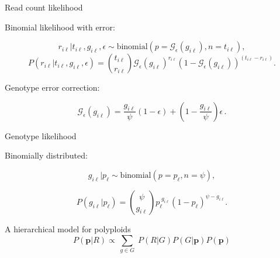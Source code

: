 \documentclass[presentation,serif]{beamer}
\begin{document}
\begin{frame}[c]{Read count likelihood}

	Binomial likelihood with error:

	\begin{equation*}
		r_{i\ell}|t_{i\ell},g_{i\ell},\epsilon \sim \text{binomial}(p = \mathcal{G}_\epsilon(g_{i\ell}), n = t_{i\ell}),
	\end{equation*}
	\pause
	\begin{equation}
		P(r_{i\ell}|t_{i\ell},g_{i\ell},\epsilon) = \binom{t_{i\ell}}{r_{i\ell}} \mathcal{G}_\epsilon(g_{i\ell})^{r_{i\ell}}(1 - \mathcal{G}_\epsilon(g_{i\ell}))^{(t_{i\ell}-r_{i\ell})}.
	\end{equation}
	\pause

	\vspace{0.25in}

	Genotype error correction:

	\begin{equation}
		\mathcal{G}_\epsilon(g_{i\ell}) = \frac{g_{i\ell}}{\psi}(1 - \epsilon) + \left(1 - \frac{g_{i\ell}}{\psi}\right)\epsilon\,.
	\end{equation}

\end{frame}

\begin{frame}[c]{Genotype likelihood}

	Binomially distributed:

	\begin{equation*}
		g_{i\ell}|p_\ell \sim \text{binomial}(p = p_\ell, n = \psi),
	\end{equation*}
	\pause

	\begin{equation}
		P(g_{i\ell}|p_\ell) = \binom{\psi}{g_{i\ell}} p_\ell ^ {\;g_{i\ell}} (1 - p_\ell)^{\psi - g_{i\ell}}.
	\end{equation}



\end{frame}

\begin{frame}[c]{A hierarchical model for polyploids}
	\fontsize{10pt}{10}\selectfont
	\vspace{-0.21in}
	\begin{equation}
		P(\mathbf{p} \vert R) \propto\, \sum_{g \in G} \; P(R \vert G) P(G \vert \mathbf{p}) P(\mathbf{p})
	\end{equation}

	\begin{center}
	\end{center}
\end{frame}
\end{document}
